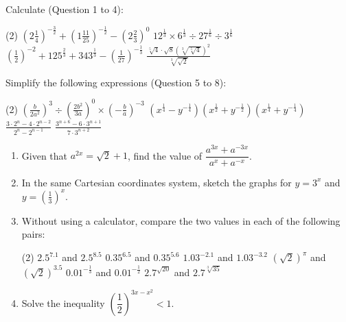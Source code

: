 \documentclass{report}
\begin{document}

        \noindent Calculate (Question 1 to 4):
        \begin{tasks}[label=\arabic*.](2)
            \task $\displaystyle\left(2 \frac{1}{4}\right)^{-\frac{3}{2}}+\left(1 \frac{11}{25}\right)^{-\frac{1}{2}}-\left(2 \frac{2}{3}\right)^0$
            \task $\displaystyle12^{\frac{1}{3}} \times 6^{\frac{1}{3}} \div 27^{\frac{1}{6}} \div 3^{\frac{1}{6}}$
            \task $\displaystyle\left(\frac{1}{2}\right)^{-2}+125^{\frac{2}{3}}+343^{\frac{1}{3}}-\left(\frac{1}{27}\right)^{-\frac{1}{3}}$
            \task $\displaystyle\frac{\sqrt[5]{4} \cdot \sqrt{8}(\sqrt[3]{\sqrt[5]{4}})^2}{\sqrt[3]{\sqrt{2}}}$
        \end{tasks}

        \vspace{-0.5em}
        \noindent Simplify the following expressions (Question 5 to 8):
        \begin{tasks}[label=\arabic*., start=5](2)
            \task $\displaystyle\left(\frac{b}{2 a^2}\right)^3 \div\left(\frac{2 b^2}{3 a}\right)^0 \times\left(-\frac{b}{a}\right)^{-3}$
            \task $\displaystyle\left(x^{\frac{1}{4}}-y^{-\frac{1}{4}}\right)\left(x^{\frac{1}{2}}+y^{-\frac{1}{2}}\right)\left(x^{\frac{1}{4}}+y^{-\frac{1}{4}}\right)$
            \task $\displaystyle\frac{3 \cdot 2^n-4 \cdot 2^{n-2}}{2^n-2^{n-1}}$
            \task $\displaystyle\frac{3^{n+6}-6 \cdot 3^{n+1}}{7 \cdot 3^{n+2}}$
        \end{tasks}

        \vspace{-1.5em}
        \begin{enumerate}[start=9]
            \item Given that $a^{2 x}=\sqrt{2}+1$, find the value of $\dfrac{a^{3 x}+a^{-3 x}}{a^x+a^{-x}}$.
            \item In the same Cartesian coordinates system, sketch the graphs for $y=3^x$ and $y=\left(\frac{1}{3}\right)^x$.
            \item Without using a calculator, compare the two values in each of the following pairs:
            \begin{tasks}[label=(\alph*)](2)
                \task $2.5^{7.1}$ and $2.5^{8.5}$
                \task $0.35^{6.5}$ and $0.35^{5.6}$
                \task $1.03^{-2.1}$ and $1.03^{-3.2}$
                \task $(\sqrt{2})^\pi$ and $(\sqrt{2})^{3.5}$
                \task $0.01^{-\frac{1}{3}}$ and $0.01^{-\frac{1}{2}}$
                \task $2.7^{\sqrt{20}}$ and $2.7^{\sqrt[3]{35}}$
            \end{tasks}
            \item Solve the inequality $\left(\dfrac{1}{2}\right)^{3 x-x^2}<1$.
        \end{enumerate}
        
\end{document}

